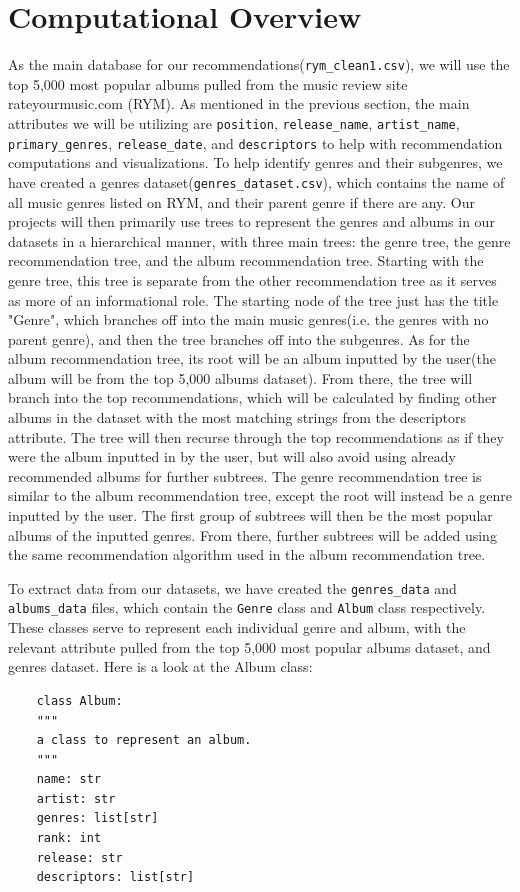 \documentclass[fontsize=11pt]{article}
\begin{document}
\section*{Computational Overview}
As the main database for our recommendations(\texttt{rym\_clean1.csv}), we will use the top 5,000 most popular albums pulled from the music review site rateyourmusic.com (RYM). As mentioned in the previous section, the main attributes we will be utilizing are \texttt{position}, \texttt{release\_name}, \texttt{artist\_name}, \texttt{primary\_genres}, \texttt{release\_date}, and \texttt{descriptors} to help with recommendation computations and visualizations. To help identify genres and their subgenres, we have created a genres dataset(\texttt{genres\_dataset.csv}), which contains the name of all music genres listed on RYM, and their parent genre if there are any. Our projects will then primarily use trees to represent the genres and albums in our datasets in a hierarchical manner, with three main trees: the genre tree, the genre recommendation tree, and the album recommendation tree. Starting with the genre tree, this tree is separate from the other recommendation tree as it serves as more of an informational role. The starting node of the tree just has the title "Genre", which branches off into the main music genres(i.e. the genres with no parent genre), and then the tree branches off into the subgenres. As for the album recommendation tree, its root will be an album inputted by the user(the album will be from the top 5,000 albums dataset). From there, the tree will branch into the top recommendations, which will be calculated by finding other albums in the dataset with the most matching strings from the descriptors attribute. The tree will then recurse through the top recommendations as if they were the album inputted in by the user, but will also avoid using already recommended albums for further subtrees. The genre recommendation tree is similar to the album recommendation tree, except the root will instead be a genre inputted by the user. The first group of subtrees will then be the most popular albums of the inputted genres. From there, further subtrees will be added using the same recommendation algorithm used in the album recommendation tree. \newline

To extract data from our datasets, we have created the \texttt{genres\_data} and \texttt{albums\_data} files, which contain the \texttt{Genre} class and \texttt{Album} class respectively. These classes serve to represent each individual genre and album, with the relevant attribute pulled from the top 5,000 most popular albums dataset, and genres dataset. Here is a look at the Album class:
\begin{verbatim}
    class Album:
    """
    a class to represent an album.
    """
    name: str
    artist: str
    genres: list[str]
    rank: int
    release: str
    descriptors: list[str]
\end{verbatim}
\end{document}

